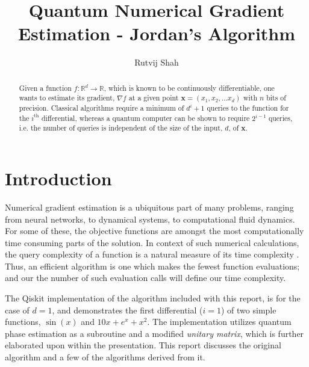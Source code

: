 \documentclass{article}
\begin{document}
\title{Quantum Numerical Gradient Estimation - Jordan's Algorithm}

\author{Rutvij Shah}

\maketitle              %


\begin{abstract}

  Given a function \(f: \mathbb{R}^d \rightarrow \mathbb{R}\), which is known to be
  continuously differentiable, one wants to estimate its gradient, \(\nabla f\) at
  a given point \(\mathbf{x} = (x_1, x_2, \ldots x_d)\) with \(n\) bits of precision.
  Classical algorithms require a minimum of \(d^i + 1\) queries to the function
  for the \(i^{\text{th}}\) differential, whereas a quantum computer can be shown to
  require \(2^{i - 1}\) queries, i.e. the number of queries is independent of the size
  of the input, \(d\), of $\mathbf{x}$.


\end{abstract}






\section{Introduction}

Numerical gradient estimation is a ubiquitous part of many problems, ranging from neural
networks, to dynamical systems, to computational fluid dynamics. For some of these, the
objective functions are amongst the most computationally time consuming parts of the solution.
In context of such numerical calculations, the query complexity of a function is a natural
measure of its time complexity \cite{quant-ph/0405146}. Thus, an efficient algorithm is one which makes the fewest
function evaluations; and our the number of such evaluation calls will define our time complexity.


The Qiskit implementation of the algorithm included with this report, is for the case of \(d = 1\),
and demonstrates the first differential (\(i = 1\)) of two simple functions,
\(\sin(x)\) and \(10 x + e^{x}  + x^2\). The implementation utilizes quantum phase estimation as
a subroutine and a modified \textit{unitary matrix}, which is further elaborated upon within the
presentation. This report discusses the original algorithm and a few of the algorithms derived from
it.
\end{document}
